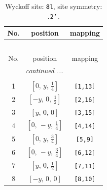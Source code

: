 \documentclass[fleqn,8pt]{jsarticle}
\begin{document}
\begin{longtable}{ccc}
\caption{Wyckoff site: {\tt 8l}, site symmetry: {\tt .2'.}}
 \\
 \hline \hline
No. & position & mapping \\ \hline \endfirsthead

\multicolumn{2}{l}{\tablename\ \thetable{}} \\
 \hline \hline
No. & position & mapping \\ \hline \endhead

 \hline \hline
\multicolumn{2}{r}{\footnotesize\it continued ...} \\ \endfoot

 \hline \hline
\multicolumn{2}{r}{} \\ \endlastfoot

1 & $\left[ 0,\, y,\, \frac{1}{4} \right]$ & {\tt [1,13]} \\ \hline
2 & $\left[ - y,\, 0,\, \frac{1}{2} \right]$ & {\tt [2,16]} \\ \hline
3 & $\left[ y,\, 0,\, 0 \right]$ & {\tt [3,15]} \\ \hline
4 & $\left[ 0,\, - y,\, \frac{1}{4} \right]$ & {\tt [4,14]} \\ \hline
5 & $\left[ 0,\, y,\, \frac{3}{4} \right]$ & {\tt [5,9]} \\ \hline
6 & $\left[ 0,\, - y,\, \frac{3}{4} \right]$ & {\tt [6,12]} \\ \hline
7 & $\left[ y,\, 0,\, \frac{1}{2} \right]$ & {\tt [7,11]} \\ \hline
8 & $\left[ - y,\, 0,\, 0 \right]$ & {\tt [8,10]} \\
\end{longtable}
\renewcommand{\arraystretch}{1.2}
\end{document}
